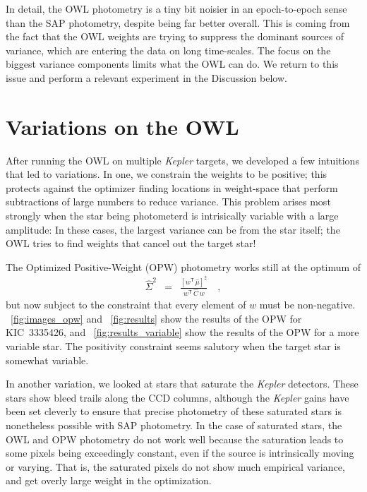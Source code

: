 \documentclass[12pt, letterpaper, preprint]{aastex}
\newcommand{\project}[1]{\textsl{#1}}
\newcommand{\transpose}[1]{{#1}^{\!\mathsf T}}
\begin{document}
In detail, the OWL photometry is a tiny bit noisier in an epoch-to-epoch sense
  than the SAP photometry,
  despite being far better overall.
This is coming from the fact that the OWL weights are trying to suppress the dominant
  sources of variance,
  which are entering the data on long time-scales.
The focus on the biggest variance components limits what the OWL can do.
We return to this issue and perform a relevant experiment in the Discussion below.

\section{Variations on the OWL}

After running the OWL on multiple \project{Kepler} targets,
  we developed a few intuitions that led to variations.
In one, we constrain the weights to be positive;
  this protects against the optimizer finding locations in weight-space
  that perform subtractions of large numbers to reduce variance.
This problem arises most strongly when the star being photometerd is intrisically variable
  with a large amplitude:
In these cases, the largest variance can be from the star itself;
  the OWL tries to find weights that cancel out the target star!

The Optimized Positive-Weight (OPW) photometry works still at the optimum of
\begin{eqnarray}
\hat{\Sigma}^2 &=& \frac{[\transpose{w}\, \hat{\mu}]^2}{\transpose{w}\, \hat{C}\, w}
\quad ,
\end{eqnarray}
but now subject to the constraint that every element of $w$ must be non-negative.
\figurename~\ref{fig:images_opw} and \figurename~\ref{fig:results}
 show the results of the OPW for KIC~3335426,
 and \figurename~\ref{fig:results_variable} show the results of the OPW
 for a more variable star.
The positivity constraint seems salutory when the target star is somewhat variable.

In another variation, we looked at stars that saturate the \project{Kepler} detectors.
These stars show bleed trails along the CCD columns,
  although the \project{Kepler} gains have been set cleverly
  to ensure that precise photometry of these saturated stars is nonetheless possible with SAP photometry.
In the case of saturated stars, the OWL and OPW photometry do not work well
  because the saturation leads to some pixels being exceedingly constant,
  even if the source is intrinsically moving or varying.
That is, the saturated pixels do not show much empirical variance,
  and get overly large weight in the optimization.
\end{document}
